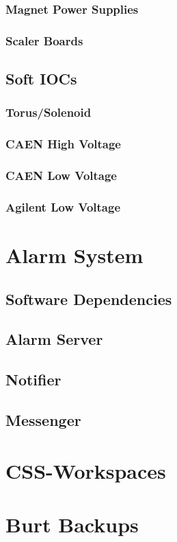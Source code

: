 \documentclass[amsmath,amssymb,notitlepage,11pt]{revtex4}
\begin{document}
\subsubsection{Magnet Power Supplies}
\subsubsection{Scaler Boards}

\subsection{Soft IOCs}
\subsubsection{Torus/Solenoid}
\subsubsection{CAEN High Voltage}
\subsubsection{CAEN Low Voltage}
\subsubsection{Agilent Low Voltage}


\section{Alarm System}
\subsection{Software Dependencies}
\subsection{Alarm Server}
\subsection{Notifier}
\subsection{Messenger}

\section{CSS-Workspaces}

\section{Burt Backups}



%
\end{document}
